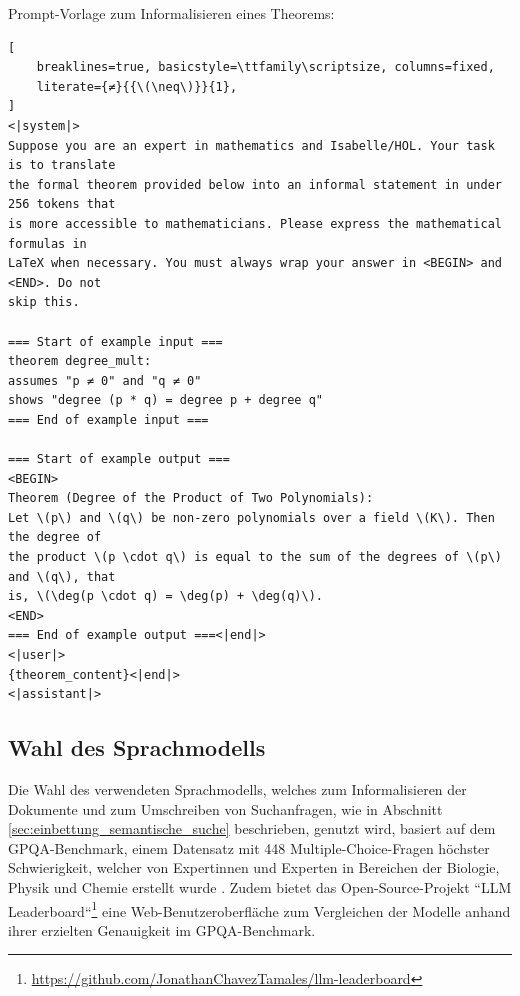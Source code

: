 \documentclass[12pt,letterpaper]{article} %
\begin{document}
\scriptsize
\begin{mybox}{Prompt-Vorlage zum Informalisieren eines Theorems:}
\begin{lstlisting}[
    breaklines=true, basicstyle=\ttfamily\scriptsize, columns=fixed,
    literate={≠}{{\(\neq\)}}{1},
]
<|system|>
Suppose you are an expert in mathematics and Isabelle/HOL. Your task is to translate
the formal theorem provided below into an informal statement in under 256 tokens that
is more accessible to mathematicians. Please express the mathematical formulas in
LaTeX when necessary. You must always wrap your answer in <BEGIN> and <END>. Do not
skip this.

=== Start of example input ===
theorem degree_mult:
assumes "p ≠ 0" and "q ≠ 0"
shows "degree (p * q) = degree p + degree q"
=== End of example input ===

=== Start of example output ===
<BEGIN>
Theorem (Degree of the Product of Two Polynomials):
Let \(p\) and \(q\) be non-zero polynomials over a field \(K\). Then the degree of
the product \(p \cdot q\) is equal to the sum of the degrees of \(p\) and \(q\), that
is, \(\deg(p \cdot q) = \deg(p) + \deg(q)\).
<END>
=== End of example output ===<|end|>
<|user|>
{theorem_content}<|end|>
<|assistant|>
\end{lstlisting}
\end{mybox}
\label{fig:prompt_vorlage}
\normalsize
\justify

\subsection{Wahl des Sprachmodells}
Die Wahl des verwendeten Sprachmodells, welches zum Informalisieren der Dokumente und zum Umschreiben von Suchanfragen, wie in Abschnitt \ref{sec:einbettung_semantische_suche} beschrieben, genutzt wird, basiert auf dem GPQA-Benchmark, einem Datensatz mit 448 Multiple-Choice-Fragen höchster Schwierigkeit, welcher von Expertinnen und Experten in Bereichen der Biologie, Physik und Chemie erstellt wurde \citep{rein_gpqa_2023}.
Zudem bietet das Open-Source-Projekt ``LLM Leaderboard``\footnote{\url{https://github.com/JonathanChavezTamales/llm-leaderboard}} eine Web-Benutzeroberfläche zum Vergleichen der Modelle anhand ihrer erzielten Genauigkeit im GPQA-Benchmark.
\end{document}
